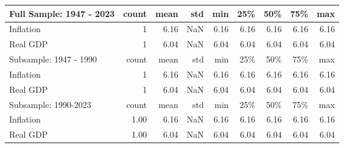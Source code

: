 \begin{tabular}{lrrrrrrrr}
\toprule
Full Sample: 1947 - 2023 & count & mean & std & min & 25\% & 50\% & 75\% & max \\
\midrule
Inflation & 1 & 6.16 & NaN & 6.16 & 6.16 & 6.16 & 6.16 & 6.16 \\
Real GDP & 1 & 6.04 & NaN & 6.04 & 6.04 & 6.04 & 6.04 & 6.04 \\
\midrule
Subsample: 1947 - 1990 & count & mean & std & min & 25\% & 50\% & 75\% & max \\
\midrule
Inflation & 1 & 6.16 & NaN & 6.16 & 6.16 & 6.16 & 6.16 & 6.16 \\
Real GDP & 1 & 6.04 & NaN & 6.04 & 6.04 & 6.04 & 6.04 & 6.04 \\
\midrule
Subsample: 1990-2023 & count & mean & std & min & 25\% & 50\% & 75\% & max \\
\midrule
Inflation & 1.00 & 6.16 & NaN & 6.16 & 6.16 & 6.16 & 6.16 & 6.16 \\
Real GDP & 1.00 & 6.04 & NaN & 6.04 & 6.04 & 6.04 & 6.04 & 6.04 \\
\bottomrule
\end{tabular}
